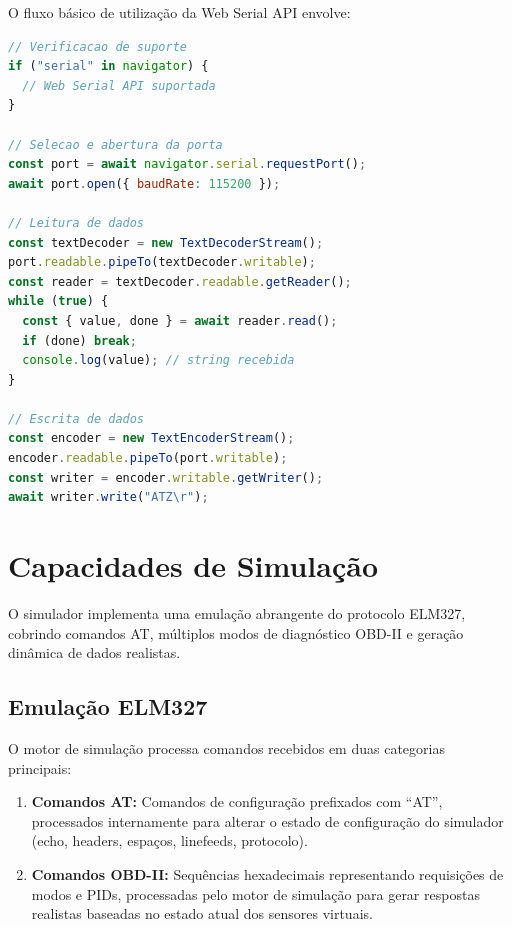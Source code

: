 O fluxo básico de utilização da Web Serial API envolve:

\begin{lstlisting}[language=JavaScript, caption={Verificação de suporte e conexão via Web Serial API.}, label={lst:web-serial}]
// Verificacao de suporte
if ("serial" in navigator) {
  // Web Serial API suportada
}

// Selecao e abertura da porta
const port = await navigator.serial.requestPort();
await port.open({ baudRate: 115200 });

// Leitura de dados
const textDecoder = new TextDecoderStream();
port.readable.pipeTo(textDecoder.writable);
const reader = textDecoder.readable.getReader();
while (true) {
  const { value, done } = await reader.read();
  if (done) break;
  console.log(value); // string recebida
}

// Escrita de dados
const encoder = new TextEncoderStream();
encoder.readable.pipeTo(port.writable);
const writer = encoder.writable.getWriter();
await writer.write("ATZ\r");
\end{lstlisting}

\section{Capacidades de Simulação}
\label{sec:capacidades}

O simulador implementa uma emulação abrangente do protocolo ELM327, cobrindo comandos AT, múltiplos modos de diagnóstico OBD-II e geração dinâmica de dados realistas.

\subsection{Emulação ELM327}

O motor de simulação processa comandos recebidos em duas categorias principais:

\begin{enumerate}
    \item \textbf{Comandos AT:} Comandos de configuração prefixados com ``AT'', processados internamente para alterar o estado de configuração do simulador (echo, headers, espaços, linefeeds, protocolo).
    \item \textbf{Comandos OBD-II:} Sequências hexadecimais representando requisições de modos e PIDs, processadas pelo motor de simulação para gerar respostas realistas baseadas no estado atual dos sensores virtuais.
\end{enumerate}

